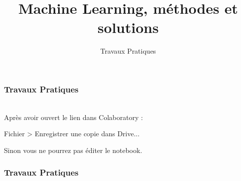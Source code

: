 \documentclass{formation}
\title{Machine Learning, méthodes et solutions}
\subtitle{Travaux Pratiques}
\begin{document}
\maketitle

\begin{frame}
  \frametitle{Travaux Pratiques}
   \\
  \newline
  Après avoir ouvert le lien dans Colaboratory :
  \begin{center}
    Fichier > Enregistrer une copie dans Drive...
  \end{center}
  Sinon vous ne pourrez pas éditer le notebook.
\end{frame}

\begin{frame}
  \frametitle{Travaux Pratiques}
   \\
\end{frame}
\end{document}
